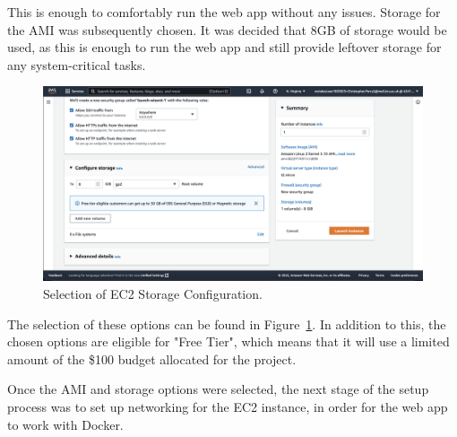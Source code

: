This is enough to comfortably run the web app without any issues.
Storage for the AMI was subsequently chosen.
It was decided that 8GB of storage would be used, as this is enough to run the web app and still provide leftover storage
for any system-critical tasks.

\begin{figure}[!htbp]
    \centering
    \includegraphics[scale=0.3]{resources/ec2/create-instance-configure-storage}
    \caption{Selection of EC2 Storage Configuration.}
    \label{fig:ec2-storage}
\end{figure}

The selection of these options can be found in Figure~\ref{fig:ec2-storage}.
In addition to this, the chosen options are eligible for "Free Tier", which means that it will use a limited amount of the
\$100 budget allocated for the project.

Once the AMI and storage options were selected, the next stage of the setup process was to set up networking for the EC2
instance, in order for the web app to work with Docker.

